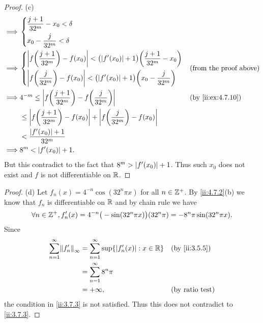 \begin{proof}{(c)}
\begin{align*}
    \implies & \begin{dcases}
                 \dfrac{j + 1}{32^m} - x_0 < \delta \\
                 x_0 - \dfrac{j}{32^m} < \delta
               \end{dcases}                                                                                                              \\
    \implies & \begin{dcases}
                 \abs{f\bigg(\dfrac{j + 1}{32^m}\bigg) - f(x_0)} < \big(\abs{f'(x_0)} + 1\big) \bigg(\dfrac{j + 1}{32^m} - x_0\bigg) \\
                 \abs{f\bigg(\dfrac{j}{32^m}\bigg) - f(x_0)} < \big(\abs{f'(x_0)} + 1\big) \bigg(x_0 - \dfrac{j}{32^m}\bigg)
               \end{dcases} &  & \text{(from the proof above)}                           \\
    \implies & 4^{-m} \leq \abs{f\bigg(\dfrac{j + 1}{32^m}\bigg) - f\bigg(\dfrac{j}{32^m}\bigg)}                                        &  & \by{ii:ex:4.7.10} \\
             & \leq \abs{f\bigg(\dfrac{j + 1}{32^m}\bigg) - f(x_0)} + \abs{f\bigg(\dfrac{j}{32^m}\bigg) - f(x_0)}                                              \\
             & < \dfrac{\abs{f'(x_0)} + 1}{32^m}                                                                                                               \\
    \implies & 8^m < \abs{f'(x_0)} + 1.
  \end{align*}
  But this contradict to the fact that \(8^m > \left\lvert f'(x_0)\right\rvert + 1\).
  Thus such \(x_0\) does not exist and \(f\) is not differentiable on \(\mathbb{R}\).
\end{proof}

\begin{proof}{(d)}
  Let \(f_n(x) = 4^{-n} \cos(32^n \pi x)\) for all \(n \in \mathbb{Z}^+\).
  By \cref{ii:4.7.2}(b) we know that \(f_n\) is differentiable on \(\mathbb{R}\) and by chain rule we have
  \[
    \forall n \in \mathbb{Z}^+, f_n'(x) = 4^{-n} \big(-\sin(32^n \pi x)\big) (32^n \pi) = - 8^n \pi \sin(32^n \pi x).
  \]
  Since
  \begin{align*}
    \sum_{n = 1}^\infty \norm*{f_n'}_\infty & = \sum_{n = 1}^\infty \sup\set{\abs{f_n'(x)} : x \in \R} &  & \by{ii:3.5.5}          \\
                                            & = \sum_{n = 1}^\infty 8^n \pi                                                        \\
                                            & = +\infty,                                               &  & \text{(by ratio test)}
  \end{align*}
  the condition in \cref{ii:3.7.3} is not satisfied.
  Thus this does not contradict to \cref{ii:3.7.3}.
\end{proof}
